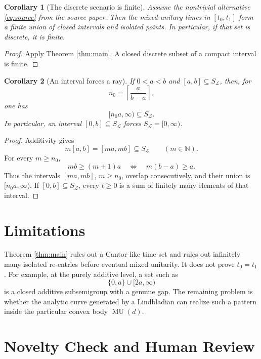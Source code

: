 \documentclass[11pt]{article}
\newtheorem{corollary}{Corollary}
\newcommand{\MU}{\operatorname{MU}}
\newcommand{\ceil}[1]{\left\lceil #1\right\rceil}
\begin{document}
\begin{corollary}[The discrete scenario is finite]\label{cor:discrete}
Assume the nontrivial alternative \eqref{eq:source} from the source paper.
Then the mixed-unitary times in \([t_0,t_1]\) form a finite union of closed
intervals and isolated points. In particular, if that set is discrete, it is
finite.
\end{corollary}

\begin{proof}
Apply Theorem \ref{thm:main}. A closed discrete subset of a compact interval
is finite.
\end{proof}

\begin{corollary}[An interval forces a ray]\label{cor:ray}
If \(0<a<b\) and \([a,b]\subseteq S_{\mathcal L}\), then, for
\[
 n_0=\ceil{\frac{a}{b-a}},
\]
one has
\[
 [n_0a,\infty)\subseteq S_{\mathcal L}.
 \tag{5}\label{eq:ray}
\]
In particular, an interval \([0,b]\subseteq S_{\mathcal L}\) forces
\(S_{\mathcal L}=[0,\infty)\).
\end{corollary}

\begin{proof}
Additivity gives
\[
 m[a,b]=[ma,mb]\subseteq S_{\mathcal L}
 \qquad(m\in\mathbb N).
\]
For every \(m\ge n_0\),
\[
 mb\ge(m+1)a
 \quad\Longleftrightarrow\quad
 m(b-a)\ge a.
\]
Thus the intervals \([ma,mb]\), \(m\ge n_0\), overlap consecutively, and
their union is \([n_0a,\infty)\). If \([0,b]\subseteq S_{\mathcal L}\),
every \(t\ge0\) is a sum of finitely many elements of that interval.
\end{proof}

\section*{Limitations}

Theorem \ref{thm:main} rules out a Cantor-like time set and rules out
infinitely many isolated re-entries before eventual mixed unitarity. It does
not prove \(t_0=t_1\). For example, at the purely additive level, a set such
as
\[
 \{0,a\}\cup[2a,\infty)
\]
is a closed additive subsemigroup with a genuine gap. The remaining problem
is whether the analytic curve generated by a Lindbladian can realize such a
pattern inside the particular convex body \(\MU(d)\).

\section*{Novelty Check and Human Review}
\end{document}
